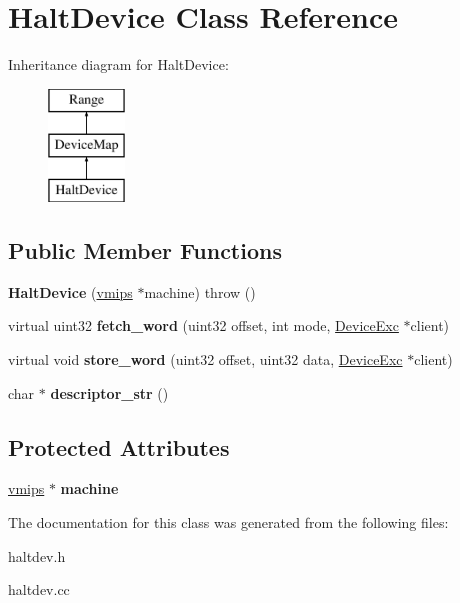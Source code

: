\hypertarget{classHaltDevice}{
\section{HaltDevice Class Reference}
\label{classHaltDevice}
}
Inheritance diagram for HaltDevice:\begin{figure}[H]
\begin{center}
\leavevmode
\includegraphics[height=3cm]{classHaltDevice}
\end{center}
\end{figure}
\subsection*{Public Member Functions}
\begin{DoxyCompactItemize}
\item 
\hypertarget{classHaltDevice_ab4948d58e6b7efd5b978ac2069c935d1}{
{\bfseries HaltDevice} (\hyperlink{classvmips}{vmips} $\ast$machine)  throw ()}
\label{classHaltDevice_ab4948d58e6b7efd5b978ac2069c935d1}

\item 
\hypertarget{classHaltDevice_a59cd92570eb9689b67656e6e92ea3457}{
virtual uint32 {\bfseries fetch\_\-word} (uint32 offset, int mode, \hyperlink{classDeviceExc}{DeviceExc} $\ast$client)}
\label{classHaltDevice_a59cd92570eb9689b67656e6e92ea3457}

\item 
\hypertarget{classHaltDevice_a4f13e32c5f0734bae65fe9c62b402e9f}{
virtual void {\bfseries store\_\-word} (uint32 offset, uint32 data, \hyperlink{classDeviceExc}{DeviceExc} $\ast$client)}
\label{classHaltDevice_a4f13e32c5f0734bae65fe9c62b402e9f}

\item 
\hypertarget{classHaltDevice_a6ff3fc3006786f97b201c3481084ca90}{
char $\ast$ {\bfseries descriptor\_\-str} ()}
\label{classHaltDevice_a6ff3fc3006786f97b201c3481084ca90}

\end{DoxyCompactItemize}
\subsection*{Protected Attributes}
\begin{DoxyCompactItemize}
\item 
\hypertarget{classHaltDevice_a025cb05a489514495a72b98123c62e87}{
\hyperlink{classvmips}{vmips} $\ast$ {\bfseries machine}}
\label{classHaltDevice_a025cb05a489514495a72b98123c62e87}

\end{DoxyCompactItemize}


The documentation for this class was generated from the following files:\begin{DoxyCompactItemize}
\item 
haltdev.h\item 
haltdev.cc\end{DoxyCompactItemize}
